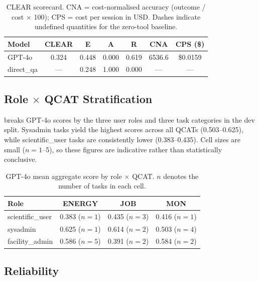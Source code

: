 \documentclass[12pt]{article}
\begin{document}
\begin{table}[ht]
\centering
\caption{CLEAR scorecard. CNA = cost-normalised accuracy (outcome / cost
  $\times$ 100); CPS = cost per session in USD. Dashes indicate undefined
  quantities for the zero-tool baseline.}
\label{tab:clear}
\begin{tabular}{lcccccc}
\toprule
\textbf{Model} & \textbf{CLEAR} & \textbf{E} & \textbf{A} & \textbf{R}
  & \textbf{CNA} & \textbf{CPS (\$)} \\
\midrule
GPT-4o     & 0.324 & 0.448 & 0.000 & 0.619 & 6536.6 & \$0.0159 \\
direct\_qa & ---   & 0.248 & 1.000 & 0.000 & ---    & ---      \\
\bottomrule
\end{tabular}
\end{table}

\subsection{Role $\times$ QCAT Stratification}

 breaks GPT-4o scores by the three user roles and three
task categories in the dev split. Sysadmin tasks yield the highest scores
across all QCATs (0.503--0.625), while scientific\_user tasks are consistently
lower (0.383--0.435). Cell sizes are small ($n=1$--5), so these figures are
indicative rather than statistically conclusive.

\begin{table}[ht]
\centering
\caption{GPT-4o mean aggregate score by role $\times$ QCAT.
  $n$ denotes the number of tasks in each cell.}
\label{tab:role_qcat}
\begin{tabular}{lccc}
\toprule
\textbf{Role} & \textbf{ENERGY} & \textbf{JOB} & \textbf{MON} \\
\midrule
scientific\_user & 0.383 ($n=1$) & 0.435 ($n=3$) & 0.416 ($n=1$) \\
sysadmin         & 0.625 ($n=1$) & 0.614 ($n=2$) & 0.503 ($n=4$) \\
facility\_admin  & 0.586 ($n=5$) & 0.391 ($n=2$) & 0.584 ($n=2$) \\
\bottomrule
\end{tabular}
\end{table}

\subsection{Reliability}
\end{document}
